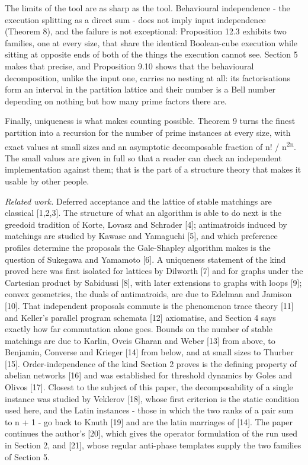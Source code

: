\documentclass[
  11pt,
]{article}
\begin{document}
The limits of the tool are as sharp as the tool. Behavioural
independence - the execution splitting as a direct sum - does not imply
input independence (Theorem 8), and the failure is not exceptional:
Proposition 12.3 exhibits two families, one at every size, that share
the identical Boolean-cube execution while sitting at opposite ends of
both of the things the execution cannot see. Section 5 makes that
precise, and Proposition 9.10 shows that the behavioural decomposition,
unlike the input one, carries no nesting at all: its factorisations form
an interval in the partition lattice and their number is a Bell number
depending on nothing but how many prime factors there are.

Finally, uniqueness is what makes counting possible. Theorem 9 turns the
finest partition into a recursion for the number of prime instances at
every size, with exact values at small sizes and an asymptotic
decomposable fraction of n! / n\textsuperscript{2n}. The small values
are given in full so that a reader can check an independent
implementation against them; that is the part of a structure theory that
makes it usable by other people.

\emph{Related work.} Deferred acceptance and the lattice of stable
matchings are classical {[}1,2,3{]}. The structure of what an algorithm
is able to do next is the greedoid tradition of Korte, Lovasz and
Schrader {[}4{]}; antimatroids induced by matchings are studied by
Kawase and Yamaguchi {[}5{]}, and which preference profiles determine
the proposals the Gale-Shapley algorithm makes is the question of
Sukegawa and Yamamoto {[}6{]}. A uniqueness statement of the kind proved
here was first isolated for lattices by Dilworth {[}7{]} and for graphs
under the Cartesian product by Sabidussi {[}8{]}, with later extensions
to graphs with loops {[}9{]}; convex geometries, the duals of
antimatroids, are due to Edelman and Jamison {[}10{]}. That independent
proposals commute is the phenomenon trace theory {[}11{]} and Keller's
parallel program schemata {[}12{]} axiomatise, and Section 4 says
exactly how far commutation alone goes. Bounds on the number of stable
matchings are due to Karlin, Oveis Gharan and Weber {[}13{]} from above,
to Benjamin, Converse and Krieger {[}14{]} from below, and at small
sizes to Thurber {[}15{]}. Order-independence of the kind Section 2
proves is the defining property of abelian networks {[}16{]} and was
established for threshold dynamics by Goles and Olivos {[}17{]}. Closest
to the subject of this paper, the decomposability of a single instance
was studied by Veklerov {[}18{]}, whose first criterion is the static
condition used here, and the Latin instances - those in which the two
ranks of a pair sum to n + 1 - go back to Knuth {[}19{]} and are the
latin marriages of {[}14{]}. The paper continues the author's {[}20{]},
which gives the operator formulation of the run used in Section 2, and
{[}21{]}, whose regular anti-phase templates supply the two families of
Section 5.
\end{document}

